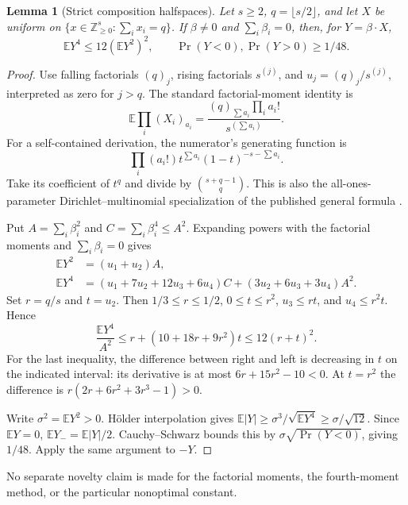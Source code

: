 \documentclass[11pt,a4paper]{article}
\newtheorem{lemma}[theorem]{Lemma}
\theoremstyle{remark}\newtheorem{remark}[theorem]{Remark}
\newcommand{\NN}{\mathbb Z_{\geq0}}
\newcommand{\fl}[1]{\lfloor#1\rfloor}
\begin{document}
\begin{lemma}[Strict composition halfspaces]\label{lem:moment}
Let \(s\geq2\), \(q=\fl{s/2}\), and let \(X\) be uniform on
\(\{x\in\NN^s:\sum_i x_i=q\}\). If \(\beta\ne0\) and
\(\sum_i\beta_i=0\), then, for \(Y=\beta\cdot X\),
\[
 \mathbb E Y^4\leq12(\mathbb E Y^2)^2,\qquad
 \Pr(Y<0),\Pr(Y>0)\geq1/48.
\]
\end{lemma}
\begin{proof}
Use falling factorials \((q)_j\), rising factorials \(s^{(j)}\),
and \(u_j=(q)_j/s^{(j)}\), interpreted as zero for \(j>q\).
The standard factorial-moment identity is
\[
 \mathbb E\prod_i(X_i)_{a_i}
 =\frac{(q)_{\sum a_i}\prod_i a_i!}{s^{(\sum a_i)}}.
\]
For a self-contained derivation, the numerator's generating function is
\[
 \prod_i(a_i!)t^{\sum a_i}(1-t)^{-s-\sum a_i}.
\]
Take its coefficient of \(t^q\) and divide by
\(\binom{s+q-1}{q}\). This is also the all-ones-parameter
Dirichlet--multinomial specialization of the published general
formula \cite[Section 4.2 and Appendix A]{T14}.

Put \(A=\sum_i\beta_i^2\) and \(C=\sum_i\beta_i^4\leq A^2\).
Expanding powers with the factorial moments and
\(\sum_i\beta_i=0\) gives
\begin{align*}
 \mathbb EY^2&=(u_1+u_2)A,\\
 \mathbb EY^4&=(u_1+7u_2+12u_3+6u_4)C
                +(3u_2+6u_3+3u_4)A^2.
\end{align*}
Set \(r=q/s\) and \(t=u_2\). Then
\(1/3\leq r\leq1/2\), \(0\leq t\leq r^2\),
\(u_3\leq rt\), and \(u_4\leq r^2t\). Hence
\[
 \frac{\mathbb EY^4}{A^2}
 \leq r+(10+18r+9r^2)t\leq12(r+t)^2.
\]
For the last inequality, the difference between right and left
is decreasing in \(t\) on the indicated interval: its derivative
is at most \(6r+15r^2-10<0\). At \(t=r^2\) the difference is
\(r(2r+6r^2+3r^3-1)>0\).

Write \(\sigma^2=\mathbb EY^2>0\). H\"older interpolation gives
\(\mathbb E|Y|\geq\sigma^3/\sqrt{\mathbb EY^4}
\geq\sigma/\sqrt{12}\).
Since \(\mathbb EY=0\), \(\mathbb EY_-=\mathbb E|Y|/2\).
Cauchy--Schwarz bounds this by
\(\sigma\sqrt{\Pr(Y<0)}\), giving \(1/48\).
Apply the same argument to \(-Y\).
\end{proof}

No separate novelty claim is made for the factorial moments,
the fourth-moment method, or the particular nonoptimal constant.
\end{document}
